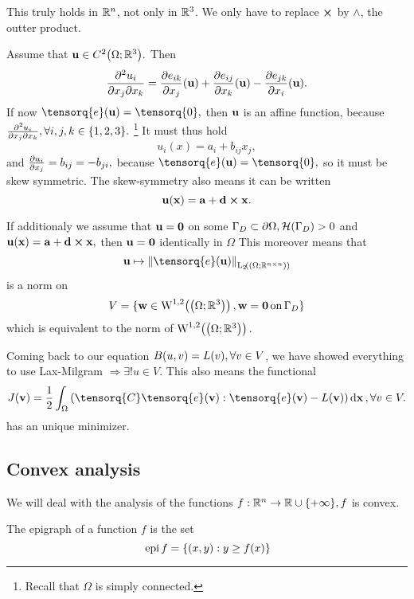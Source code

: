 \documentclass[reqno, a4paper]{article}
\begin{document}
\begin{remark}[$\R^n$]
    This truly holds in $\R^n$, not only in ${\mathbb R}^3$. We only have to replace $\cross$ by $\wedge$, the outter product.
\end{remark}

Assume that $\vb{u} \in C^2\qty(\Omega ; {\mathbb R}^3).$ Then
\[
	\pdv[2]{u_i}{x_j}{x_k} = \pdv{e_{ik}}{x_j}\qty(\vb{u}) + \pdv{e_{ij}}{x_k}\qty(\vb{u}) - \pdv{e_{jk}}{x_i}\qty(\vb{u}).
\]
If now $\tensorq{e}\qty(\vb{u}) = \tensorq{0}, $ then $\vb{u}$ is an affine function, because $\pdv[2]{u_i}{x_j}{x_k}, \forall i,j,k \in \{1, 2, 3\}.$ \footnote{Recall that $\Omega$ is simply connected.} It must thus hold
\[
	u_i(x) = a_i + b_{ij}x_j,
\]
and $\pdv{u_i}{x_j} = b_{ij} = - b_{ji},$ because $\tensorq{e}\qty(\vb{u}) = \tensorq{0},$ so it must be skew symmetric. The skew-symmetry also means it can be written
\[
	\vb{u}\qty(\vb{x}) = \vb{a} + \vb{d} \cross \vb{x}.
\]

If additionaly we assume that $\vb{u} = \vb{0}$ on some $\Gamma_D \subset \partial \Omega, \mathcal{H}\qty(\Gamma_{D})>0$ and $\vb{u}\qty(\vb{x}) = \vb{a}+ \vb{d} \cross \vb{x},$ then $\vb{u} = \vb{0}$ identically in $\Omega$
This moreover means that
\[
	\vb{u} \mapsto \norm{\tensorq{e}\qty(\vb{u})}_{\LpSet[2]{\qty(\Omega; \R^{n \times n})}}
\]
is a norm on
\[
	V = \{ \vb{w} \in \WkpSet[1][2]{\qty(\Omega; \R^3)}, \vb{w} = \vb{0} \, \text{on} \, \Gamma_D \}
\]
which is equivalent to the norm of $\WkpSet[1][2]{\qty(\Omega; \R^3)}.$

Coming back to our equation $B\qty(u,v) = L(v), \forall v \in V$, we have showed everything to use Lax-Milgram $\Rightarrow \exists ! u \in V.$ This also means the functional
\[
	J(\vb{v}) = \frac{1}{2} \int_{\Omega}\qty(\tensorq{C}\tensorq{e}\qty(\vb{v}) :\tensorq{e}\qty(\vb{v})-L\qty(\vb{v}))\dd{\vb{x}}, \forall v \in V.
\]
has an unique minimizer.

\subsection{Convex analysis}
\label{sec:convex_analysis}

We will deal with the analysis of the functions $f: {\mathbb R}^n \to {\mathbb R} \cup \{+ \infty \}, f$ is convex.

\begin{definition}
	The epigraph of a function $f$ is the set
	\[
		\, \text{epi} \, f = \{\qty(x,y): y \geq f(x) \}
	\]
\end{definition}
\end{document}
